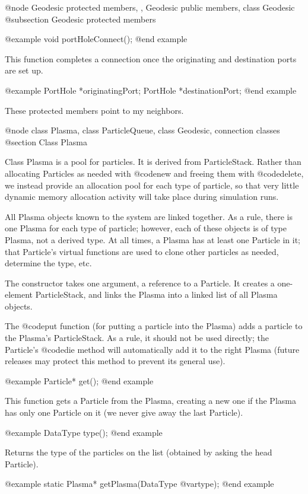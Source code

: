 @node Geodesic protected members,  , Geodesic public members, class Geodesic
@subsection Geodesic protected members

@example
void portHoleConnect();
@end example

This function completes a connection once the originating and
destination ports are set up.

@example
PortHole *originatingPort;
PortHole *destinationPort;
@end example

These protected members point to my neighbors.

@node class Plasma, class ParticleQueue, class Geodesic, connection classes
@section Class Plasma

Class Plasma is a pool for particles.  It is derived from ParticleStack.
Rather than allocating Particles as needed with @code{new} and freeing
them with @code{delete}, we instead provide an allocation pool for each
type of particle, so that very little dynamic memory allocation activity
will take place during simulation runs.

All Plasma objects known to the system are linked together.  As a rule,
there is one Plasma for each type of particle; however, each of these
objects is of type Plasma, not a derived type.  At all times, a Plasma
has at least one Particle in it; that Particle's virtual functions are
used to clone other particles as needed, determine the type, etc.

The constructor takes one argument, a reference to a Particle.  It
creates a one-element ParticleStack, and links the Plasma into a linked
list of all Plasma objects.

The @code{put} function (for putting a particle into the Plasma) adds a
particle to the Plasma's ParticleStack.  As a rule, it should not be
used directly; the Particle's @code{die} method will automatically add
it to the right Plasma (future releases may protect this method to
prevent its general use).

@example
Particle* get();
@end example

This function gets a Particle from the Plasma, creating a new one if
the Plasma has only one Particle on it (we never give away the last
Particle).

@example
DataType type();
@end example

Returns the type of the particles on the list (obtained by asking the
head Particle).

@example
static Plasma* getPlasma(DataType @var{type});
@end example

